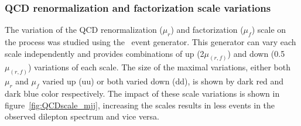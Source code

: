 \subsubsection{QCD renormalization and factorization scale variations}
The variation of the QCD renormalization ($\mu_r$) and factorization ($\mu_f$) scale on the process was studied using the \sherpa\ event generator. This generator can vary each scale independently and provides combinations of up (2$\mu_(r,f)$) and down (0.5$\mu_(r,f)$) variations of each scale. The size of the maximal variations, either both $\mu_r$ and $\mu_f$ varied up (uu) or both varied down (dd), is shown by dark red and dark blue color respectively. The impact of these scale variations is shown in figure~\ref{fig:QCDscale_mjj}, increasing the scales results in less events in the observed dilepton \pt spectrum and vice versa.
